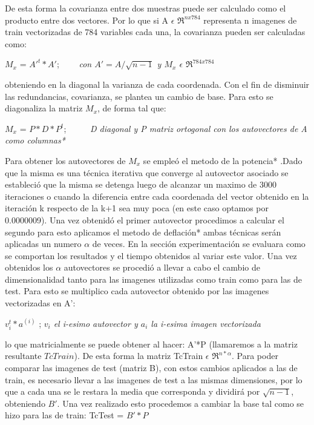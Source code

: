 De esta forma la covarianza entre dos muestras puede ser calculado como el producto entre dos vectores. Por lo que si A $\epsilon$ $\Re^{nx784}$ representa n imagenes de train vectorizadas de 784 variables cada una, la covarianza pueden ser calculadas como:\newline

 $M_x$ = $A'^{t}*A'$; \ \ \ \ \textit {con $A'=A/\sqrt{n-1}$ y $M_x$ $\epsilon$  $\Re^{784x784}$} \newline

obteniendo en la diagonal la varianza de cada coordenada. Con el fin de disminuir las redundancias, covarianza, se plantea un cambio de base. Para esto se diagonaliza la matriz $M_x$, de forma tal que: \newline

 $M_x$ = $P*D*P^{t}$; \ \ \ \ \ \textit{D diagonal y P matriz ortogonal con los autovectores de A como columnas*} \newline%
 
 Para obtener los autovectores de $M_x$ se empleó el metodo de la potencia* %
.Dado que la misma es una técnica iterativa que converge al autovector asociado se estableció que la misma se detenga luego de alcanzar un maximo de 3000 iteraciones o cuando la diferencia entre cada coordenada del vector obtenido en la iteración k respecto de la k+1 sea muy poca (en este caso optamos por 0.0000009). Una vez obtenidó el primer autovector procedimos a calcular el segundo para esto aplicamos el metodo de deflación* %
ambas técnicas serán aplicadas un numero $\alpha$ de veces. En la sección experimentación se evaluara como se comportan los resultados y el tiempo obtenidos al variar este valor.
Una vez obtenidos los $\alpha$ autovectores se procedió a llevar a cabo el cambio de dimensionalidad tanto para las imagenes utilizadas como train como para las de test. Para esto se multiplico cada autovector obtenido por las imagenes vectorizadas en A': \newline

$v_i^{t}*a^{(i)}$ ; \textit{$v_i$ el i-esimo autovector y $a_i$ la i-esima imagen vectorizada} \newline

lo que matricialmente se puede obtener al hacer: A'*P (llamaremos a la matriz resultante $TcTrain$). De esta forma la matriz TcTrain $\epsilon$ $\Re^{n*\alpha}$. Para poder comparar las imagenes de test (matriz B), con estos cambios aplicados a las de train, es necesario llevar a las imagenes de test a las mismas dimensiones, por lo que a cada una se le restara la media que corresponda y dividirá por $\sqrt{n-1}$, obteniendo $ B'$. 
Una vez realizado esto procedemos a cambiar la base tal como se hizo para las de train:
 TcTest = $B'*P$

